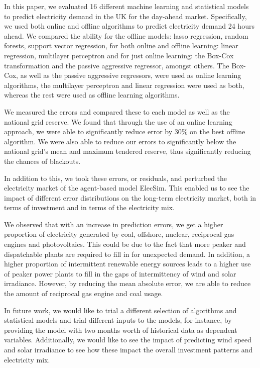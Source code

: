 \documentclass[final,3p,times,twocolumn,numbers]{elsarticle}
\begin{document}
In this paper, we evaluated 16 different machine learning and statistical models to predict electricity demand in the UK for the day-ahead market. Specifically, we used both online and offline algorithms to predict electricity demand 24 hours ahead. We compared the ability for the offline models: lasso regression, random forests, support vector regression, for both online and offline learning: linear regression, multilayer perceptron and for just online learning: the Box-Cox transformation and the passive aggressive regressor, amongst others. The Box-Cox, as well as the passive aggressive regressors, were used as online learning algorithms, the multilayer perceptron and linear regression were used as both, whereas the rest were used as offline learning algorithms.

We measured the errors and compared these to each model as well as the national grid reserve. We found that through the use of an online learning approach, we were able to significantly reduce error by 30\% on the best offline algorithm.  We were also able to reduce our errors to significantly below the national grid's mean and maximum tendered reserve, thus significantly reducing the chances of blackouts.

In addition to this, we took these errors, or residuals, and perturbed the electricity market of the agent-based model ElecSim. This enabled us to see the impact of different error distributions on the long-term electricity market, both in terms of investment and in terms of the electricity mix.

We observed that with an increase in prediction errors, we get a higher proportion of electricity generated by coal, offshore, nuclear, reciprocal gas engines and photovoltaics. This could be due to the fact that more peaker and dispatchable plants are required to fill in for unexpected demand. In addition, a higher proportion of intermittent renewable energy sources leads to a higher use of peaker power plants to fill in the gaps of intermittency of wind and solar irradiance. However, by reducing the mean absolute error, we are able to reduce the amount of reciprocal gas engine and coal usage.

In future work, we would like to trial a different selection of algorithms and statistical models and trial different inputs to the models, for instance, by providing the model with two months worth of historical data as dependent variables. Additionally, we would like to see the impact of predicting wind speed and solar irradiance to see how these impact the overall investment patterns and electricity mix. 
\end{document}
